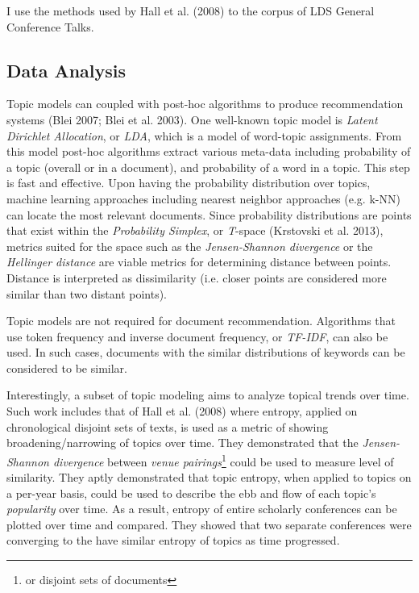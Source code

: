 I use the methods used by Hall et al. (2008)
to the corpus of LDS General Conference Talks. 

\subsection{Data Analysis}
Topic models can coupled with post-hoc algorithms to produce recommendation systems (Blei 2007; Blei et al. 2003). %
 One well-known topic model is \emph{Latent Dirichlet Allocation}, or \emph{LDA}, which is a model of word-topic assignments. From this model post-hoc algorithms extract various meta-data including probability of a topic (overall or in a document), and probability of a word in a topic. This step is fast and effective. Upon having the probability distribution over topics, machine learning approaches including nearest neighbor approaches (e.g. k-NN) can locate the most relevant documents. Since probability distributions are points that exist within the \textit{Probability Simplex}, or \emph{T}-space 
(Krstovski et al. 2013),  %
metrics suited for the space such as the \emph{Jensen-Shannon divergence} or the \emph{Hellinger distance} are viable metrics for determining distance between points. Distance is interpreted as dissimilarity (i.e. closer points are considered more similar than two distant points). 

Topic models are not required for document recommendation. Algorithms that use token frequency and inverse document frequency, or \emph{TF-IDF}, can also be used. In such cases, documents with the similar distributions of keywords can be considered to be similar. 


Interestingly, a subset of topic modeling aims to analyze topical trends over time. Such work includes that of Hall et al. (2008) %
where entropy, applied on chronological disjoint sets of texts, is used as a metric of showing broadening/narrowing of topics over time. They demonstrated that the \emph{Jensen-Shannon divergence} between \emph{venue pairings}\footnote{or disjoint sets of documents} could be used to measure level of similarity. They aptly demonstrated that topic entropy, when applied to topics on a per-year basis, could be used to describe the ebb and flow of each topic's \emph{popularity} over time. As a result, entropy of entire scholarly conferences can be plotted over time and compared. They showed that two separate conferences were converging to the have similar entropy of topics as time progressed.

